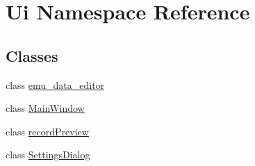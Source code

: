 \hypertarget{a00145}{\section{Ui Namespace Reference}
\label{a00145}
}
\subsection*{Classes}
\begin{DoxyCompactItemize}
\item 
class \hyperlink{a00009}{emu\+\_\+data\+\_\+editor}
\item 
class \hyperlink{a00018}{Main\+Window}
\item 
class \hyperlink{a00074}{record\+Preview}
\item 
class \hyperlink{a00076}{Settings\+Dialog}
\end{DoxyCompactItemize}
